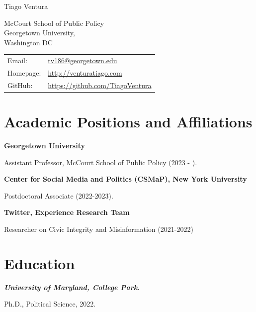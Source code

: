 \documentclass[letterpaper, 11pt]{article}
\def\name{Tiago Ventura}
\begin{document}
    {\huge \name}


    \vspace{0.25in}

    \begin{minipage}{0.45\linewidth}
        McCourt School of Public Policy\\
        Georgetown University,  \\
        Washington DC
    \end{minipage}
    \begin{minipage}{0.45\linewidth}
        \begin{tabular}{ll}
            Email:          & \href{mailto:tv186@georgetown.edu}{tv186@georgetown.edu}          \\
            Homepage:       & \href{http://venturatiago.com/}{http://venturatiago.com}             \\
            GitHub:         & \href{https://github.com/TiagoVentura}{https://github.com/TiagoVentura}
        \end{tabular}
    \end{minipage}


\section*{Academic Positions and Affiliations}

{\textbf{Georgetown University}}

Assistant Professor, McCourt School of Public Policy (2023 - ).
\vspace{.3cm}

{\textbf{Center for Social Media and Politics (CSMaP), New York University}}

Postdoctoral Associate (2022-2023).

\vspace{.3cm}

\textbf{Twitter, Experience Research Team}

Researcher on Civic Integrity and Misinformation (2021-2022)

\section*{Education}

\textit{\textbf{University of Maryland, College Park.}}

Ph.D., Political Science, 2022.
\end{document}
